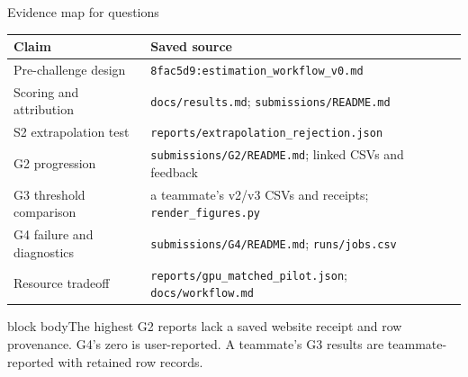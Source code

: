 \documentclass[aspectratio=169,11pt]{beamer}
\newcommand{\caveat}[1]{\begin{beamercolorbox}[sep=.16cm,wd=\linewidth]{block body}\small #1\end{beamercolorbox}}
\begin{document}
\appendix
\begin{frame}{Evidence map for questions}
\small
\begin{tabular}{@{}p{}p{}@{}}
\toprule
Claim & Saved source \\
\midrule
Pre-challenge design & \texttt{8fac5d9:estimation\_workflow\_v0.md} \\
Scoring and attribution & \texttt{docs/results.md}; \texttt{submissions/README.md} \\
S2 extrapolation test & \texttt{reports/extrapolation\_rejection.json} \\
G2 progression & \texttt{submissions/G2/README.md}; linked CSVs and feedback \\
G3 threshold comparison & a teammate's v2/v3 CSVs and receipts; \texttt{render\_figures.py} \\
G4 failure and diagnostics & \texttt{submissions/G4/README.md}; \texttt{runs/jobs.csv} \\
Resource tradeoff & \texttt{reports/gpu\_matched\_pilot.json}; \texttt{docs/workflow.md} \\
\bottomrule
\end{tabular}
\vspace{.25cm}
\caveat{The highest G2 reports lack a saved website receipt and row provenance. G4's zero is user-reported. A teammate's G3 results are teammate-reported with retained row records.}
\end{frame}
\end{document}
